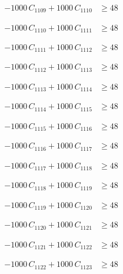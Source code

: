 \documentclass[a4paper,11pt]{article}
\begin{document}
\begin{align}
-1000\,C_{1109} + 1000\,C_{1110} &\geq 48 \nonumber
\end{align}

\begin{align}
-1000\,C_{1110} + 1000\,C_{1111} &\geq 48 \nonumber
\end{align}

\begin{align}
-1000\,C_{1111} + 1000\,C_{1112} &\geq 48 \nonumber
\end{align}

\begin{align}
-1000\,C_{1112} + 1000\,C_{1113} &\geq 48 \nonumber
\end{align}

\begin{align}
-1000\,C_{1113} + 1000\,C_{1114} &\geq 48 \nonumber
\end{align}

\begin{align}
-1000\,C_{1114} + 1000\,C_{1115} &\geq 48 \nonumber
\end{align}

\begin{align}
-1000\,C_{1115} + 1000\,C_{1116} &\geq 48 \nonumber
\end{align}

\begin{align}
-1000\,C_{1116} + 1000\,C_{1117} &\geq 48 \nonumber
\end{align}

\begin{align}
-1000\,C_{1117} + 1000\,C_{1118} &\geq 48 \nonumber
\end{align}

\begin{align}
-1000\,C_{1118} + 1000\,C_{1119} &\geq 48 \nonumber
\end{align}

\begin{align}
-1000\,C_{1119} + 1000\,C_{1120} &\geq 48 \nonumber
\end{align}

\begin{align}
-1000\,C_{1120} + 1000\,C_{1121} &\geq 48 \nonumber
\end{align}

\begin{align}
-1000\,C_{1121} + 1000\,C_{1122} &\geq 48 \nonumber
\end{align}

\begin{align}
-1000\,C_{1122} + 1000\,C_{1123} &\geq 48 \nonumber
\end{align}
\end{document}
